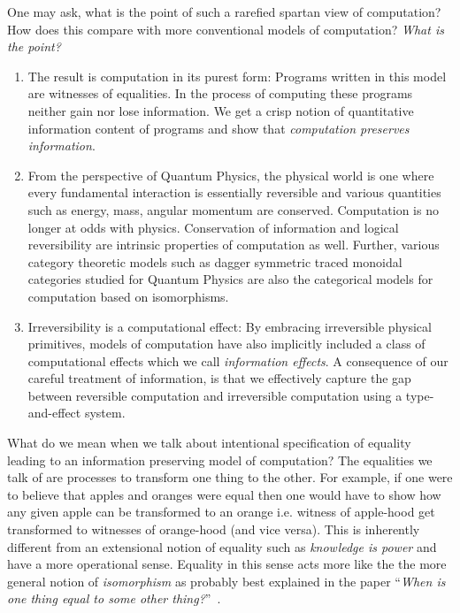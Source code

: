 \documentclass{article}
\begin{document}
One may ask, what is the point of such a rarefied spartan view of
computation? How does this compare with more conventional models of
computation?  \emph{What is the point?} 

\begin{enumerate}

\item The result is computation in its purest form: Programs written
  in this model are witnesses of equalities. In the process of
  computing these programs neither gain nor lose information. We get a
  crisp notion of quantitative information content of programs and
  show that \emph{computation preserves information}.

\item From the perspective of Quantum Physics, the physical world is
  one where every fundamental interaction is essentially reversible
  and various quantities such as energy, mass, angular momentum are
  conserved. Computation is no longer at odds with
  physics. Conservation of information and logical reversibility are
  intrinsic properties of computation as well. Further, various
  category theoretic models such as dagger symmetric traced monoidal
  categories studied for Quantum Physics are also the categorical
  models for computation based on isomorphisms.

\item Irreversibility is a computational effect: By embracing
  irreversible physical primitives, models of computation have also
  implicitly included a class of computational effects which we call
  \emph{information effects}. A consequence of our careful treatment
  of information, is that we effectively capture the gap between
  reversible computation and irreversible computation using a
  type-and-effect system.

\end{enumerate}

What do we mean when we talk about intentional specification of
equality leading to an information preserving model of computation?
The equalities we talk of are processes to transform one thing to the
other. For example, if one were to believe that apples and oranges
were equal then one would have to show how any given apple can be
transformed to an orange i.e. witness of apple-hood get transformed to
witnesses of orange-hood (and vice versa). This is inherently
different from an extensional notion of equality such as
\emph{knowledge is power} and have a more operational sense. Equality
in this sense acts more like the the more general notion of
\emph{isomorphism} as probably best explained in the paper
``\emph{When is one thing equal to some other
  thing?}''~\cite{mazur2008one}.
\end{document}
